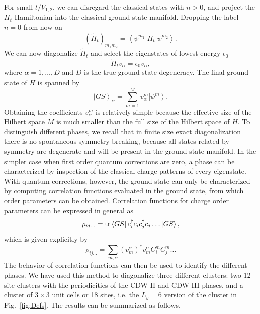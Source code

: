 \documentclass[aps,prx,10pt,twocolumn,floatfix,superscriptaddress,showpacs,numerical,footinbib]{revtex4-1}
\begin{document}
For small $t/V_{1,2}$, we can disregard the classical states with $n>0$, and project the $H_t$ Hamiltonian into the classical ground state manifold. 
%
Dropping the label $n=0$ from now on
%
\begin{equation}
(\tilde{H}_t)_{m_1m_2} =  \left< \psi^{m_1} \right| H_t \left| \psi^{m_2} \right>.
\end{equation}
%
We can now diagonalize $\tilde{H}_t$ and select the eigenstates of lowest energy $\epsilon_0$
%
\begin{equation}
\tilde{H}_t v_\alpha = \epsilon_0 v_\alpha,
\end{equation}
%
where $\alpha = 1,\ldots,D$ and $D$ is the true ground state degeneracy. The final ground state of $H$ is spanned by
%
\begin{equation}
\left| GS\right>_\alpha = \sum_{m=1}^M v^m_\alpha \left| \psi^m\right>.
\end{equation}
%
Obtaining the coefficients $v^m_\alpha$ is relatively simple because the effective size of the Hilbert space $M$ is much smaller than the full size of the Hilbert space of $H$.
%
To distinguish different phases, we recall that in finite size exact diagonalization there is no spontaneous symmetry breaking, because all states related by symmetry are degenerate and will be present in the ground state manifold. 
%
In the simpler case when first order quantum corrections are zero, a phase can be characterized by inspection of the classical charge patterns of every eigenstate. 
%
With quantum corrections, however, the ground state can only be characterized by computing correlation functions evaluated in the ground state, from which order parameters can be obtained. 
%
Correlation functions for charge order parameters can be expressed in general as
%
\begin{equation}
\rho_{ij\ldots} = {\rm tr} \left< GS \right| c^\dagger_i c_ic^\dagger_j c_j \ldots \left| GS \right>, 
\end{equation}
%
which is given explicitly by
%
\begin{equation}
\rho_{ij\ldots} = \sum_{m,\alpha} (v_m^\alpha)^*v_m^\alpha C^m_i C^m_j \dots
\end{equation}
%
The behavior of correlation functions can then be used to identify the different phases. 
%
We have used this method to diagonalize three different clusters: two 12 site clusters with the periodicities of the CDW-II and CDW-III phases, 
%
and a cluster of $3\times3$ unit cells or 18 sites, i.e. the $L_y=6$ version of the cluster in Fig.~\ref{fig:Defs}. 
%
The results can be summarized as follows. \\
\end{document}
